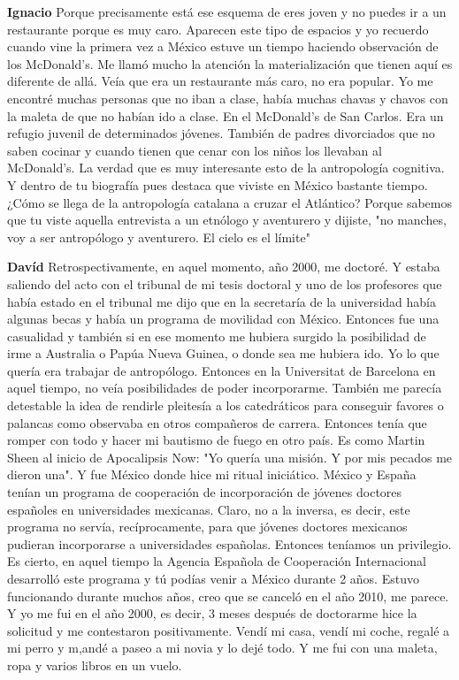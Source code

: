 \documentclass[
  spanish,
  11pt,
  a4paper,
]{scrbook}
\newenvironment{transcripcion}{
    \begin{list}{}{
        \setlength{\leftmargin}{1.5em}  %
        \setlength{\rightmargin}{0em}
        \setlength{\itemsep}{0.2em}     %
        \setlength{\parsep}{0.0em}
        \setlength{\listparindent}{0pt}
    }
}{
    \end{list}
}
\newcommand{\personaje}[1]{\textbf{#1}\quad}
\begin{document}
\begin{transcripcion}
\item \personaje{Ignacio} Porque precisamente está ese esquema de eres joven y no puedes ir a un restaurante porque es muy caro. Aparecen este tipo de espacios y yo recuerdo cuando vine la primera vez a México estuve un tiempo haciendo observación de los McDonald's. Me llamó mucho la atención la materialización que tienen aquí es diferente de allá. Veía que era un restaurante más caro, no era popular. Yo me encontré muchas personas que no iban a clase, había muchas chavas y chavos con la maleta de que no habían ido a clase. En el McDonald's de San Carlos. Era un refugio juvenil de determinados jóvenes. También de padres divorciados que no saben cocinar y cuando tienen que cenar con los niños los llevaban al McDonald's. La verdad que es muy interesante esto de la antropología cognitiva. Y dentro de tu biografía pues destaca que viviste en México bastante tiempo. ¿Cómo se llega de la antropología catalana a cruzar el Atlántico? Porque sabemos que tu viste aquella entrevista a un etnólogo y aventurero y dijiste, "no manches, voy a ser antropólogo y aventurero. El cielo es el límite"

\item \personaje{Davíd} Retrospectivamente, en aquel momento, año 2000, me doctoré. Y estaba saliendo del acto con el tribunal de mi tesis doctoral y uno de los profesores que había estado en el tribunal me dijo que en la secretaría de la universidad había algunas becas y había un programa de movilidad con México. Entonces fue una casualidad y también si en ese momento me hubiera surgido la posibilidad de irme a Australia o Papúa Nueva Guinea, o donde sea me hubiera ido. Yo lo que quería era trabajar de antropólogo. Entonces en la Universitat de Barcelona en aquel tiempo, no veía posibilidades de poder incorporarme. También me parecía detestable la idea de rendirle pleitesía a los catedráticos para conseguir favores o palancas como observaba en otros compañeros de carrera. Entonces tenía que romper con todo y hacer mi bautismo de fuego en otro país. Es como Martin Sheen al inicio de Apocalipsis Now: "Yo quería una misión. Y por mis pecados me dieron una". Y fue México donde hice mi ritual iniciático. México y España tenían un programa de cooperación de incorporación de jóvenes doctores españoles en universidades mexicanas. Claro, no a la inversa, es decir, este programa no servía, recíprocamente, para que jóvenes doctores mexicanos pudieran incorporarse a universidades españolas. Entonces teníamos un privilegio. Es cierto, en aquel tiempo la Agencia Española de Cooperación Internacional desarrolló este programa y tú podías venir a México durante 2 años. Estuvo funcionando durante muchos años, creo que se canceló en el año 2010, me parece. Y yo me fui en el año 2000, es decir, 3 meses después de doctorarme hice la solicitud y me contestaron positivamente. Vendí mi casa, vendí mi coche, regalé a mi perro y m,andé a paseo a mi novia y lo dejé todo. Y me fui con una maleta, ropa y varios libros en un vuelo.


\end{transcripcion}
\end{document}
